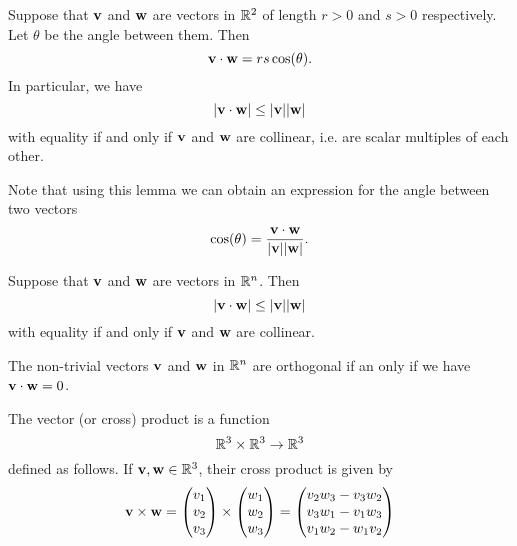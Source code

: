 \documentclass[10pt, a4paper]{article}
\begin{document}
\begin{lemma}
    Suppose that $\mathbf{v}$ and $\mathbf{w}$ are vectors in $\mathbb{R} ^ 2$ of length $r > 0 $ and $s > 0$ respectively. Let $\theta$ be the angle between them. Then
    \[
    \mathbf{v \cdot w} = rs\cos(\theta).
    \]
    In particular, we have
    \[
    |\mathbf{v \cdot w}| \leq |\mathbf{v}||\mathbf{w}|
    \]
    with equality if and only if $\mathbf{v}$ and $\mathbf{w}$ are collinear, i.e. are scalar multiples of each other.
\end{lemma}

\begin{remark}
    Note that using this lemma we can obtain an expression for the angle between two vectors
    \[
    \cos(\theta) = \frac{\mathbf{v \cdot w}}{|\mathbf{v}||\mathbf{w}|}.
    \]
\end{remark}

\begin{theorem}
    Suppose that $\mathbf{v}$ and $\mathbf{w}$ are vectors in $\mathbb{R} ^ n$. Then
    \[
    |\mathbf{v \cdot w}| \leq |\mathbf{v}||\mathbf{w}|
    \]
    with equality if and only if $\mathbf{v}$ and $\mathbf{w}$ are collinear.
\end{theorem}

\begin{corollary}
    The non-trivial vectors $\mathbf{v}$ and $\mathbf{w}$ in $\mathbb{R} ^ n$ are orthogonal if an only if we have $\mathbf{v} \cdot \mathbf{w} = 0$.
\end{corollary}

\begin{definition}
    The vector (or cross) product is a function
    \[
    \mathbb{R} ^ 3 \times \mathbb{R} ^ 3 \rightarrow \mathbb{R} ^ 3
    \]
    defined as follows. If $\mathbf{v, w} \in \mathbb{R} ^ 3$, their cross product is given by
    \[
    \mathbf{v \times w} =
    \begin{pmatrix} v_1 \\ v_2 \\ v_3 \end{pmatrix}
    \times
    \begin{pmatrix} w_1 \\ w_2 \\ w_3 \end{pmatrix}
    =
    \begin{pmatrix} v_2 w_3 - v_3 w_2 \\ v_3 w_1 - v_1 w_3 \\ v_1 w_2 - w_1 v_2 \end{pmatrix}
    \]
\end{definition}
\end{document}
